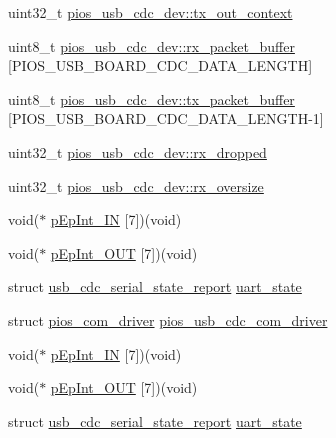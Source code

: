 \begin{DoxyCompactItemize}
\item 
uint32\-\_\-t \hyperlink{group___p_i_o_s___u_s_b___c_o_m_ga81d00c55fe107bb853a8629706b0acb4}{pios\-\_\-usb\-\_\-cdc\-\_\-dev\-::tx\-\_\-out\-\_\-context}
\item 
uint8\-\_\-t \hyperlink{group___p_i_o_s___u_s_b___c_o_m_ga82f6a571f9bf92fae2d7368be2407a27}{pios\-\_\-usb\-\_\-cdc\-\_\-dev\-::rx\-\_\-packet\-\_\-buffer} \mbox{[}\-P\-I\-O\-S\-\_\-\-U\-S\-B\-\_\-\-B\-O\-A\-R\-D\-\_\-\-C\-D\-C\-\_\-\-D\-A\-T\-A\-\_\-\-L\-E\-N\-G\-T\-H\mbox{]}
\item 
uint8\-\_\-t \hyperlink{group___p_i_o_s___u_s_b___c_o_m_ga1b086465e042517001948516cfa908d1}{pios\-\_\-usb\-\_\-cdc\-\_\-dev\-::tx\-\_\-packet\-\_\-buffer} \mbox{[}\-P\-I\-O\-S\-\_\-\-U\-S\-B\-\_\-\-B\-O\-A\-R\-D\-\_\-\-C\-D\-C\-\_\-\-D\-A\-T\-A\-\_\-\-L\-E\-N\-G\-T\-H-\/1\mbox{]}
\item 
uint32\-\_\-t \hyperlink{group___p_i_o_s___u_s_b___c_o_m_gaf423c6fd8c8e8d95b5dc5d9242df40da}{pios\-\_\-usb\-\_\-cdc\-\_\-dev\-::rx\-\_\-dropped}
\item 
uint32\-\_\-t \hyperlink{group___p_i_o_s___u_s_b___c_o_m_ga88576a84665e4d9b17001b7cb5efebc6}{pios\-\_\-usb\-\_\-cdc\-\_\-dev\-::rx\-\_\-oversize}
\item 
void($\ast$ \hyperlink{group___p_i_o_s___u_s_b___c_o_m_ga0992c19a0f2e317fcd93f755d316a0fd}{p\-Ep\-Int\-\_\-\-I\-N} \mbox{[}7\mbox{]})(void)
\item 
void($\ast$ \hyperlink{group___p_i_o_s___u_s_b___c_o_m_ga549396ff4348c565f52117dd27ad52ca}{p\-Ep\-Int\-\_\-\-O\-U\-T} \mbox{[}7\mbox{]})(void)
\item 
struct \hyperlink{structusb__cdc__serial__state__report}{usb\-\_\-cdc\-\_\-serial\-\_\-state\-\_\-report} \hyperlink{group___p_i_o_s___u_s_b___c_o_m_gaf7f356f1ada9744b2424b2980baa2a81}{uart\-\_\-state}
\item 
struct \hyperlink{structpios__com__driver}{pios\-\_\-com\-\_\-driver} \hyperlink{group___p_i_o_s___u_s_b___c_o_m_gad661bf144c28ea36f290b0092e6957e2}{pios\-\_\-usb\-\_\-cdc\-\_\-com\-\_\-driver}
\item 
void($\ast$ \hyperlink{group___p_i_o_s___u_s_b___c_o_m_ga0992c19a0f2e317fcd93f755d316a0fd}{p\-Ep\-Int\-\_\-\-I\-N} \mbox{[}7\mbox{]})(void)
\item 
void($\ast$ \hyperlink{group___p_i_o_s___u_s_b___c_o_m_ga549396ff4348c565f52117dd27ad52ca}{p\-Ep\-Int\-\_\-\-O\-U\-T} \mbox{[}7\mbox{]})(void)
\item 
struct \hyperlink{structusb__cdc__serial__state__report}{usb\-\_\-cdc\-\_\-serial\-\_\-state\-\_\-report} \hyperlink{group___p_i_o_s___u_s_b___c_o_m_gaf7f356f1ada9744b2424b2980baa2a81}{uart\-\_\-state}

\end{DoxyCompactItemize}
